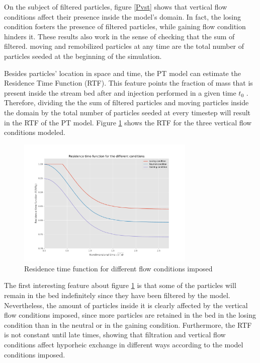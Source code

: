 \documentclass[draft,linenumbers]{agujournal2018}
\begin{document}
On the subject of filtered particles, figure \ref{Pvst} shows that vertical flow conditions affect their presence inside the model's domain. In fact, the losing condition fosters the presence of filtered particles, while gaining flow condition hinders it. These results also work in the sense of checking that the sum of filtered. moving and remobilized particles at any time are the total number of particles seeded at the beginning of the simulation. 

Besides particles' location in space and time, the PT model can estimate the Residence Time Function (RTF). This feature points the fraction of mass that is present inside the stream bed after and injection performed in a given time $t_0$ \citep{Elliott1997,Packman2000}. Therefore, dividing the the sum of filtered particles and moving particles inside the domain by the total number of particles seeded at every timestep will result in the RTF of the PT model. Figure \ref{RTF} shows the RTF for the three vertical flow conditions modeled.

\begin{figure}[ht]
\centering
\includegraphics[trim=0.2cm 0.2cm 0.2cm 0.2cm, width=20pc]
{181203_RTF.pdf}
\caption{Residence time function for different flow conditions imposed}
\label{RTF}
\end{figure}

The first interesting feature about figure \ref{RTF} is that some of the particles will remain in the bed indefinitely since they have been filtered by the model. Nevertheless, the amount of particles inside it is clearly affected by the vertical flow conditions imposed, since more particles are retained in the bed in the losing condition than in the neutral or in the gaining condition. Furthermore, the RTF is not constant until late times, showing that filtration and vertical flow conditions affect hyporheic exchange in different ways according to the model conditions imposed.   
\end{document}
